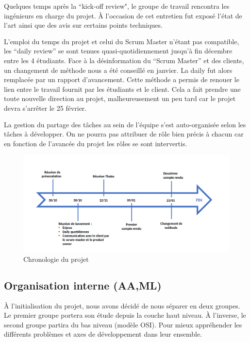 Quelques temps après la “kick-off review", le groupe de travail rencontra les ingénieurs en charge
du projet. À l’occasion de cet entretien fut exposé l’état de l’art ainsi que des avis sur certains
points techniques. \medskip

L’emploi du temps du projet et celui du Scrum Master n’étant pas compatible, les “daily review” se
sont tenues quasi-quotidiennement jusqu’à fin décembre entre les 4 étudiants. Face à la désinformation
du “Scrum Master” et des clients, un changement de méthode nous a été conseillé en janvier. La daily
fut alors remplacée par un rapport d’avancement. Cette méthode a permis de renouer le lien entre le
travail fournit par les étudiants et le client. Cela a fait prendre une toute nouvelle direction au
projet, malheureusement un peu tard car le projet devra s'arrêter le 25 février.\medskip

La gestion du partage des tâches au sein de l’équipe s’est auto-organisée selon les tâches à
développer. On ne pourra pas attribuer de rôle bien précis à chacun car en fonction de l'avancée du
projet les rôles se sont intervertis.

\begin{figure}[th]
    \centering
    \includegraphics[scale=0.35]{Figures/fleche.png}
    \decoRule
    \caption{Chronologie du projet}  \label{fig:fleche}
\end{figure}

\subsection{Organisation interne (AA,ML)}

À l’initialisation du projet, nous avons décidé de nous séparer en deux groupes. Le
premier groupe portera son étude depuis la couche haut niveau. À l’inverse, le second
groupe partira du bas niveau (modèle OSI). Pour mieux appréhender les différents
problèmes et axes de développement dans leur ensemble. \medskip

